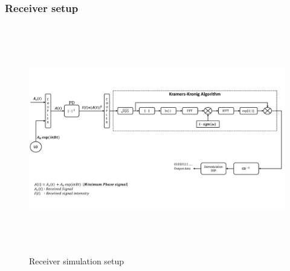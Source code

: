 \newpage
\subsubsection{Receiver setup}
\begin{figure}[h]
	\centering
	\includegraphics[width=1.0\textwidth, height=10cm]{./sdf/simplified_coherent_receiver/figures/Simulation_setup_Rx.pdf}
	\caption{Receiver simulation setup}\label{Simulation_setup_Rx}
\end{figure}
